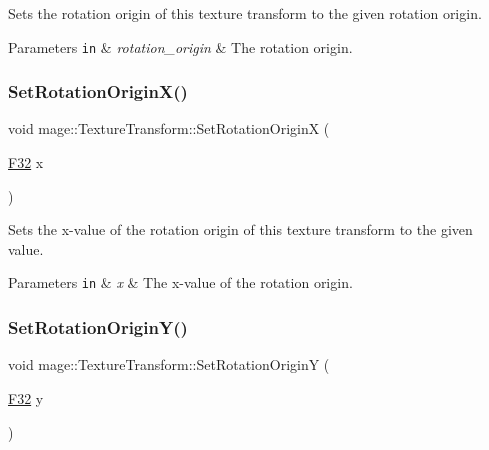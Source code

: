 Sets the rotation origin of this texture transform to the given rotation origin.


\begin{DoxyParams}[1]{Parameters}
\mbox{\tt in}  & {\em rotation\+\_\+origin} & The rotation origin. \\
\hline
\end{DoxyParams}
\hypertarget{classmage_1_1_texture_transform_a7df3d49e14ce92fc8071f15d35018eb8}{}\label{classmage_1_1_texture_transform_a7df3d49e14ce92fc8071f15d35018eb8} 
\subsubsection{\texorpdfstring{Set\+Rotation\+Origin\+X()}{SetRotationOriginX()}}
{\footnotesize\ttfamily void mage\+::\+Texture\+Transform\+::\+Set\+Rotation\+OriginX (\begin{DoxyParamCaption}\item[{\hyperlink{namespacemage_aa97e833b45f06d60a0a9c4fc22ae02c0}{F32}}]{x }\end{DoxyParamCaption})\hspace{0.3cm}{\ttfamily [noexcept]}}

Sets the x-\/value of the rotation origin of this texture transform to the given value.


\begin{DoxyParams}[1]{Parameters}
\mbox{\tt in}  & {\em x} & The x-\/value of the rotation origin. \\
\hline
\end{DoxyParams}
\hypertarget{classmage_1_1_texture_transform_af5808699dd47eb6672391e5725a0b7ea}{}\label{classmage_1_1_texture_transform_af5808699dd47eb6672391e5725a0b7ea} 
\subsubsection{\texorpdfstring{Set\+Rotation\+Origin\+Y()}{SetRotationOriginY()}}
{\footnotesize\ttfamily void mage\+::\+Texture\+Transform\+::\+Set\+Rotation\+OriginY (\begin{DoxyParamCaption}\item[{\hyperlink{namespacemage_aa97e833b45f06d60a0a9c4fc22ae02c0}{F32}}]{y }\end{DoxyParamCaption})\hspace{0.3cm}{\ttfamily [noexcept]}}

